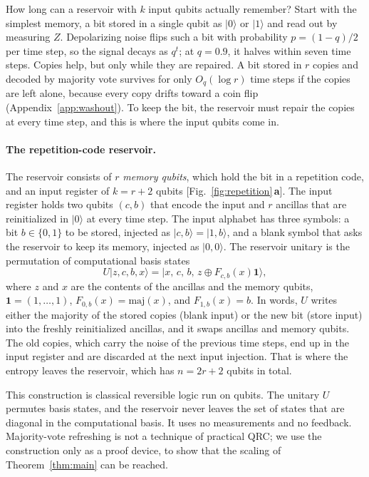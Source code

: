\documentclass[aps,pra,reprint,superscriptaddress,floatfix]{revtex4-2}
\theoremstyle{plain}
\newcommand{\ket}[1]{|#1\rangle}
\newcommand{\pnl}[1]{\textsf{\textbf{#1}}}
\begin{document}
How long can a reservoir with $k$ input qubits actually remember? Start with the simplest memory, a bit stored in a single qubit as $\ket0$ or $\ket1$ and read out by measuring $Z$. Depolarizing noise flips such a bit with probability $p=(1-q)/2$ per time step, so the signal decays as $q^t$; at $q=0.9$, it halves within seven time steps. Copies help, but only while they are repaired. A bit stored in $r$ copies and decoded by majority vote survives for only $O_q(\log r)$ time steps if the copies are left alone, because every copy drifts toward a coin flip (Appendix~\ref{app:washout}). To keep the bit, the reservoir must repair the copies at every time step, and this is where the input qubits come in.

\paragraph*{The repetition-code reservoir.}
The reservoir consists of $r$ \emph{memory qubits}, which hold the bit in a repetition code, and an input register of $k=r+2$ qubits [Fig.~\ref{fig:repetition}\,\pnl{a}]. The input register holds two qubits $(c,b)$ that encode the input and $r$ ancillas that are reinitialized in $\ket0$ at every time step. The input alphabet has three symbols: a bit $b\in\{0,1\}$ to be stored, injected as $\ket{c,b}=\ket{1,b}$, and a blank symbol that asks the reservoir to keep its memory, injected as $\ket{0,0}$. The reservoir unitary is the permutation of computational basis states
\begin{equation}
U\ket{z,c,b,x}=\ket{x,\,c,\,b,\,z\oplus F_{c,b}(x)\bm1},
\label{eq:repU}
\end{equation}
where $z$ and $x$ are the contents of the ancillas and the memory qubits, $\bm1=(1,\dots,1)$, $F_{0,b}(x)=\mathrm{maj}(x)$, and $F_{1,b}(x)=b$. In words, $U$ writes either the majority of the stored copies (blank input) or the new bit (store input) into the freshly reinitialized ancillas, and it swaps ancillas and memory qubits. The old copies, which carry the noise of the previous time steps, end up in the input register and are discarded at the next input injection. That is where the entropy leaves the reservoir, which has $n=2r+2$ qubits in total.

This construction is classical reversible logic run on qubits. The unitary $U$ permutes basis states, and the reservoir never leaves the set of states that are diagonal in the computational basis. It uses no measurements and no feedback. Majority-vote refreshing is not a technique of practical QRC; we use the construction only as a proof device, to show that the scaling of Theorem~\ref{thm:main} can be reached.
\end{document}
